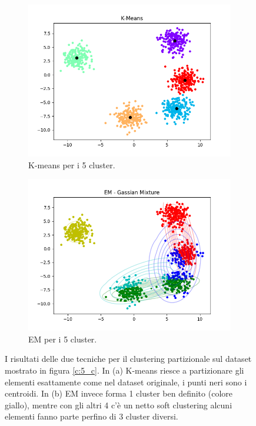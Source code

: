 \documentclass{llncs}
\begin{document}
	\begin{figure}[h]
		\centering
		\begin{subfigure}{.45\textwidth}
		  \centering
		  \includegraphics[width=\linewidth]{immagini/5_clusters_kmeans.png}
		  \caption{K-means per i 5 cluster.}
		  \label{part_norm:a}
		\end{subfigure}%
		\begin{subfigure}{.45\textwidth}
		  \centering
		  \includegraphics[width=\linewidth]{immagini/5_clusters_gmm.png}
		  \caption{EM per i 5 cluster.}
		  \label{part_norm:b}
		\end{subfigure}
		\caption{I risultati delle due tecniche per il clustering partizionale sul dataset mostrato in figura \ref{c:5_c}.
		In (a) K-means riesce a partizionare gli elementi esattamente come nel dataset originale, i punti neri sono i centroidi. In (b) EM invece forma 1 cluster ben definito (colore giallo), mentre con gli altri 4 c'è un
		netto soft clustering alcuni elementi fanno parte perfino di 3 cluster diversi.}
		\label{part_norm:test}
	\end{figure}
\end{document}
